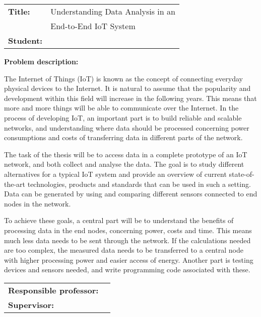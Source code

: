 \begin{titlingpage}

\noindent
\begin{tabular}{@{}p{4cm}l}
\textbf{Title:} 	& Understanding Data Analysis in an \\& End-to-End IoT System\\
\textbf{Student:}	& \theauthor \\
\end{tabular}

\vspace{4ex}
\noindent\textbf{Problem description:}
\vspace{2ex}

\noindent The Internet of Things (IoT) is known as the concept of connecting everyday physical devices to the Internet. It is natural to assume that the popularity and development within this field will increase in the following years. This means that more and more things will be able to communicate over the Internet. In the process of developing IoT, an important part is to build reliable and scalable networks, and understanding where data should be processed concerning power consumptions and costs of transferring data in different parts of the network. 

\noindent The task of the thesis will be to access data in a complete prototype of an IoT network, and both collect and analyse the data. The goal is to study different alternatives for a typical IoT system and provide an overview of current state-of-the-art technologies, products and standards that can be used in such a setting. Data can be generated by using and comparing different sensors connected to end nodes in the network.

\noindent To achieve these goals, a central part will be to understand the benefits of processing data in the end nodes, concerning power, costs and time. This means much less data needs to be sent through the network. If the calculations needed are too complex, the measured data needs to be transferred to a central node with higher processing power and easier access of energy. Another part is testing devices and sensors needed, and write programming code associated with these. 

\vspace{6ex}

\noindent
\begin{tabular}{@{}p{4cm}l}
\textbf{Responsible professor:} 	& \theprofessor \\
\textbf{Supervisor:}			& \thesupervisor \\
\end{tabular}

\end{titlingpage}